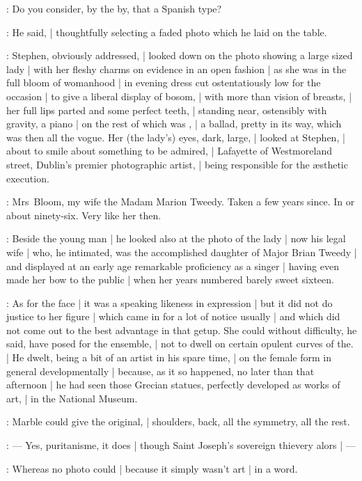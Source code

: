 \Bloom:
Do you consider, by the by, that a Spanish type?

:
He said, |
thoughtfully selecting a faded photo which he laid on the table.

:
Stephen, obviously addressed, |
looked down on the photo showing a large sized lady |
with her fleshy charms on evidence in an open fashion |
as she was in the full bloom of womanhood |
in evening dress cut ostentatiously low for the occasion |
to give a liberal display of bosom, |
with more than vision of breasts, |
her full lips parted and some perfect teeth, |
standing near, ostensibly with gravity, a piano |
on the rest of which was , |
a ballad, pretty in its way, which was then all the vogue.
Her (the lady's) eyes, dark, large, |
looked at Stephen, |
about to smile about something to be admired, |
Lafayette of Westmoreland street, Dublin's premier photographic artist, |
being responsible for the æsthetic execution.

\Bloom:
Mrs~Bloom, my wife the  Madam Marion Tweedy.
Taken a few years since.
In or about ninety-six.
Very like her then.

:
Beside the young man |
he looked also at the photo of the lady |
now his legal wife |
who, he intimated, was the accomplished daughter of Major Brian Tweedy |
and displayed at an early age remarkable proficiency as a singer |
having even made her bow to the public |
when her years numbered barely sweet sixteen.

:
As for the face |
it was a speaking likeness in expression |
but it did not do justice to her figure |
which came in for a lot of notice usually |
and which did not come out to the best advantage in that getup.
She could without difficulty, he said, have posed for the ensemble, |
not to dwell on certain opulent curves of the. |
He dwelt, being a bit of an artist in his spare time, |
on the female form in general developmentally |
because, as it so happened, no later than that afternoon |
he had seen those Grecian statues, perfectly developed as works of art, |
in the National Museum.

:
Marble could give the original, |
shoulders, back, all the symmetry, all the rest.

:
    --- Yes, puritanisme, it does |
        though Saint Joseph's sovereign thievery alors |
         ---

:
Whereas no photo could |
because it simply wasn't art |
in a word.

